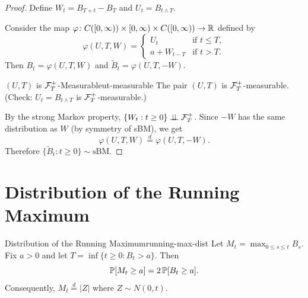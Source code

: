\begin{proof}
    Define $W_t = B_{T+t} - B_T$ and $U_t = B_{t \wedge T}$.

    Consider the map $\varphi \colon C([0,\infty)) \times [0,\infty) \times C([0,\infty)) \to \mathbb{R}$ defined by
    \[
        \varphi(U, T, W) =
        \begin{cases}
            U_t & \text{if } t \leq T, \\
            a + W_{t-T} & \text{if } t > T.
        \end{cases}
    \]
    Then $B_t = \varphi(U, T, W)$ and $\tilde{B}_t = \varphi(U, T, -W)$.

    \begin{claim}{$(U, T)$ is $\mathcal{F}_T^+$-Measurable}{ut-measurable}
        The pair $(U, T)$ is $\mathcal{F}_T^+$-measurable. (Check: $U_t = B_{t \wedge T}$ is $\mathcal{F}_T^+$-measurable.)
    \end{claim}

    By the strong Markov property, $\{W_t : t \geq 0\} \perp\!\!\!\perp \mathcal{F}_T^+$. Since $-W$ has the same distribution as $W$ (by symmetry of sBM), we get
    \[
        \varphi(U, T, W) \stackrel{d}{=} \varphi(U, T, -W).
    \]
    Therefore $\{\tilde{B}_t : t \geq 0\} \sim \mathrm{sBM}$.
\end{proof}

\section{Distribution of the Running Maximum}

\begin{theorem}{Distribution of the Running Maximum}{running-max-dist}
    Let $M_t = \max_{0 \leq s \leq t} B_s$. Fix $a > 0$ and let $T = \inf\{t \geq 0 : B_t > a\}$. Then
    \[
        \mathbb{P}[M_t \geq a] = 2\,\mathbb{P}[B_t \geq a].
    \]
    Consequently, $M_t \stackrel{d}{=} |Z|$ where $Z \sim N(0, t)$.
\end{theorem}

